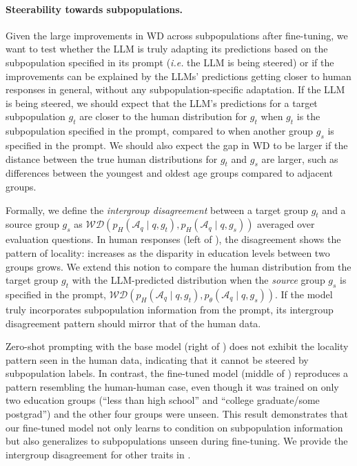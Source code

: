 \paragraph{Steerability towards subpopulations.}
Given the large improvements in WD across subpopulations after fine-tuning, we want to test whether the LLM is truly adapting its predictions based on the subpopulation specified in its prompt (\textit{i.e.} the LLM is being steered) or if the improvements can be explained by the LLMs' predictions getting closer to human responses in general, without any subpopulation-specific adaptation. 
If the LLM is being steered, we should expect that the LLM's predictions for a target subpopulation $g_t$ are closer to the human distribution for $g_t$ when $g_t$ is the subpopulation specified in the prompt, compared to when another group $g_s$ is specified in the prompt.
We should also expect the gap in WD to be larger if the distance between the true human distributions for $g_t$ and $g_s$ are larger, such as differences between the youngest and oldest age groups compared to adjacent groups.

Formally, we define the \textit{intergroup disagreement} between a target group $g_t$ and a source group $g_s$ as \(\mathcal{WD}(p_H(\mathcal{A}_q \mid q, g_t), p_H(\mathcal{A}_q \mid q, g_s))\) averaged over evaluation questions. In human responses (left of ), the disagreement shows the pattern of locality: increases as the disparity in education levels between two groups grows.
We extend this notion to compare the human distribution from the target group \(g_t\) with the LLM-predicted distribution when the \textit{source} group $g_s$ is specified in the prompt,
\(\mathcal{WD}(p_H(\mathcal{A}_q \mid q, g_t), p_{\theta}(\mathcal{A}_q \mid q, g_s))\). If the model truly incorporates subpopulation information from the prompt, its intergroup disagreement pattern should mirror that of the human data.

Zero-shot prompting with the base model (right of ) does not exhibit the locality pattern seen in the human data, indicating that it cannot be steered by subpopulation labels. In contrast, the fine-tuned model (middle of ) reproduces a pattern resembling the human-human case, even though it was trained on only two education groups (“less than high school” and “college graduate/some postgrad”) and the other four groups were unseen. This result demonstrates that our fine-tuned model not only learns to condition on subpopulation information but also generalizes to subpopulations unseen during fine-tuning.
We provide the intergroup disagreement for other traits in .


